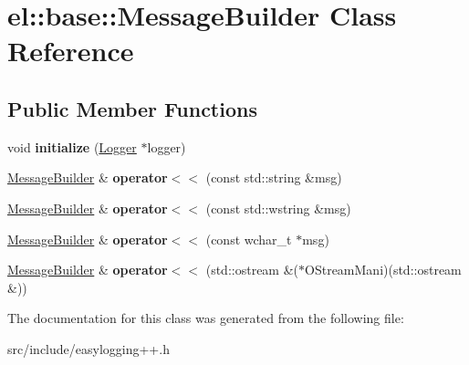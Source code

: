 \hypertarget{classel_1_1base_1_1_message_builder}{}\section{el\+:\+:base\+:\+:Message\+Builder Class Reference}
\label{classel_1_1base_1_1_message_builder}
\subsection*{Public Member Functions}
\begin{DoxyCompactItemize}
\item 
\mbox{\label{classel_1_1base_1_1_message_builder_a61729d9b620eb7b3e6ac1af69364553c}} 
void {\bfseries initialize} (\hyperlink{classel_1_1_logger}{Logger} $\ast$logger)
\item 
\mbox{\label{classel_1_1base_1_1_message_builder_a740a968d7f2901d49a2e1c348cfea7bf}} 
\hyperlink{classel_1_1base_1_1_message_builder}{Message\+Builder} \& {\bfseries operator$<$$<$} (const std\+::string \&msg)
\item 
\mbox{\label{classel_1_1base_1_1_message_builder_ad04c5d0a8fc38662ede9aaa742912a42}} 
\hyperlink{classel_1_1base_1_1_message_builder}{Message\+Builder} \& {\bfseries operator$<$$<$} (const std\+::wstring \&msg)
\item 
\mbox{\label{classel_1_1base_1_1_message_builder_a42c2a21a6bebb2ad52d22da054cd8f49}} 
\hyperlink{classel_1_1base_1_1_message_builder}{Message\+Builder} \& {\bfseries operator$<$$<$} (const wchar\+\_\+t $\ast$msg)
\item 
\mbox{\label{classel_1_1base_1_1_message_builder_a884b9fd5f742f5fa25bbc78d3415a674}} 
\hyperlink{classel_1_1base_1_1_message_builder}{Message\+Builder} \& {\bfseries operator$<$$<$} (std\+::ostream \&($\ast$O\+Stream\+Mani)(std\+::ostream \&))
\end{DoxyCompactItemize}


The documentation for this class was generated from the following file\+:\begin{DoxyCompactItemize}
\item 
src/include/easylogging++.\+h\end{DoxyCompactItemize}
